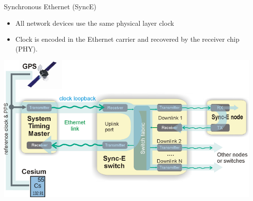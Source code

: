 \documentclass[compress,red]{beamer}
\begin{document}
\begin{frame}{Synchronous Ethernet (SyncE)}
  \begin{center}
  \begin{itemize}
   	\item All network devices use the same physical layer clock
    \item Clock is encoded in the Ethernet carrier and recovered by the receiver chip (PHY).
  \end{itemize}
  \includegraphics[width=.9\textwidth]{misc/synce.pdf}
  \end{center}

\end{frame}
\end{document}
